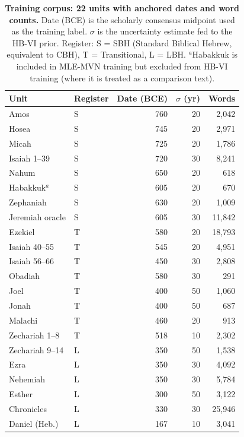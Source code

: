 \documentclass[10pt,letterpaper]{article}
\begin{document}
\begin{table}[!ht]
\centering
\caption{\textbf{Training corpus: 22 units with anchored dates and word
counts.}  Date (BCE) is the scholarly consensus midpoint used as the
training label.  $\sigma$ is the uncertainty estimate fed to the HB-VI
prior.  Register: S = SBH (Standard Biblical Hebrew, equivalent to CBH),
T = Transitional, L = LBH.  $^a$Habakkuk is included in MLE-MVN training
but excluded from HB-VI training (where it is treated as a comparison text).}
\begin{tabular}{llrrr}
\hline
\textbf{Unit} & \textbf{Register} & \textbf{Date (BCE)} &
  \textbf{$\sigma$ (yr)} & \textbf{Words} \\
\hline
Amos           & S & 760 & 20 & 2{,}042 \\
Hosea          & S & 745 & 20 & 2{,}971 \\
Micah          & S & 725 & 20 & 1{,}786 \\
Isaiah 1--39   & S & 720 & 30 & 8{,}241 \\
Nahum          & S & 650 & 20 & 618  \\
Habakkuk$^a$     & S & 605 & 20 & 670 \\
Zephaniah      & S & 630 & 20 & 1{,}009 \\
Jeremiah oracle& S & 605 & 30 & 11{,}842 \\
Ezekiel        & T & 580 & 20 & 18{,}793 \\
Isaiah 40--55  & T & 545 & 20 & 4{,}951 \\
Isaiah 56--66  & T & 450 & 30 & 2{,}808 \\
Obadiah        & T & 580 & 30 & 291  \\
Joel           & T & 400 & 50 & 1{,}060 \\
Jonah          & T & 400 & 50 & 687  \\
Malachi        & T & 460 & 20 & 913  \\
Zechariah 1--8 & T & 518 & 10 & 2{,}302 \\
Zechariah 9--14& L & 350 & 50 & 1{,}538 \\
Ezra           & L & 350 & 30 & 4{,}092 \\
Nehemiah       & L & 350 & 30 & 5{,}784 \\
Esther         & L & 300 & 50 & 3{,}122 \\
Chronicles     & L & 330 & 30 & 25{,}946 \\
Daniel (Heb.)  & L & 167 & 10 & 3{,}041 \\
\hline
\end{tabular}
\label{tab:corpus}
\end{table}
\end{document}
